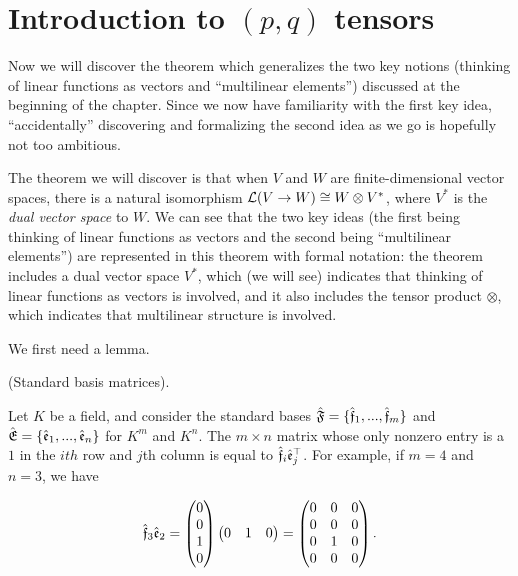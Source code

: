 \newpage

\section{Introduction to $(p, q)$ tensors}
\label{ch::motivated_intro::sec::motivated_intro}

Now we will discover the theorem which generalizes the two key notions (thinking of linear functions as vectors and ``multilinear elements'') discussed at the beginning of the chapter. Since we now have familiarity with the first key idea, ``accidentally'' discovering and formalizing the second idea as we go is hopefully not too ambitious.

The theorem we will discover is that when $V$ and $W$ are finite-dimensional vector spaces, there is a natural isomorphism $\mathcal{L}(V \rightarrow W) \cong W \otimes V^*$, where $V^*$ is the \textit{dual vector space} to $W$. We can see that the two key ideas (the first being thinking of linear functions as vectors and the second being ``multilinear elements'') are represented in this theorem with formal notation: the theorem includes a dual vector space $V^*$, which (we will see) indicates that thinking of linear functions as vectors is involved, and it also includes the tensor product $\otimes$, which indicates that multilinear structure is involved.

We first need a lemma.

\begin{lemma}
    (Standard basis matrices).

    Let $K$ be a field, and consider the standard bases ${\hat{\mathfrak{F}}} = \{ \hat{\mathfrak{f}}_1, ..., \hat{\mathfrak{f}}_m\}$ and ${\hat{\mathfrak{E}}} = \{\hat{\mathfrak{e}}_1, ..., \hat{\mathfrak{e}}_n\}$ for $K^m$ and $K^n$. The $m \times n$ matrix whose only nonzero entry is a $1$ in the $ith$ row and $j$th column is equal to $\hat{\mathfrak{f}}_i \hat{\mathfrak{e}}_j^\top$. For example, if $m = 4$ and $n = 3$, we have

    \begin{align*}
        \hat{\mathfrak{f}}_3 \hat{\mathfrak{e}}_2 = 
        \begin{pmatrix}
            0 \\
            0 \\
            1 \\
            0
        \end{pmatrix}
        \begin{pmatrix}
            0 & 1 & 0
        \end{pmatrix}
        =
        \begin{pmatrix}
            0 & 0 & 0 \\
            0 & 0 & 0 \\
            0 & 1 & 0 \\
            0 & 0 & 0
        \end{pmatrix}.
    \end{align*}
\end{lemma}

